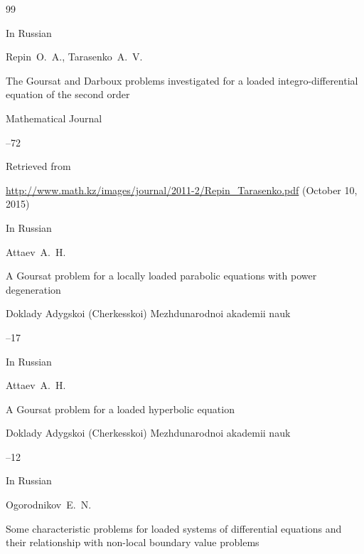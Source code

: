 \begin{thebibliography}{99}




\lang In Russian

\by Repin~O.~A., Tarasenko~A.~V.

\paper The Goursat and Darboux problems investigated for a loaded integro-differential equation of the second order

\jour Mathematical Journal




--72

\elink Retrieved from 

 \url{http://www.math.kz/images/journal/2011-2/Repin_Tarasenko.pdf} (October  10, 2015) 






\lang In Russian

\by Attaev~A.~H.

\paper A Goursat problem for a locally loaded parabolic equations with power degeneration

\jour Doklady Adygskoi (Cherkesskoi) Mezhdunarodnoi akademii nauk




--17






\lang In Russian

\by Attaev~A.~H.

\paper A Goursat problem for a loaded hyperbolic equation

\jour Doklady Adygskoi (Cherkesskoi) Mezhdunarodnoi akademii nauk




--12






\lang In Russian

\by Ogorodnikov~E.~N.

\paper Some characteristic problems for loaded systems of differential equations and their relationship with non-local boundary value problems


\end{thebibliography}
